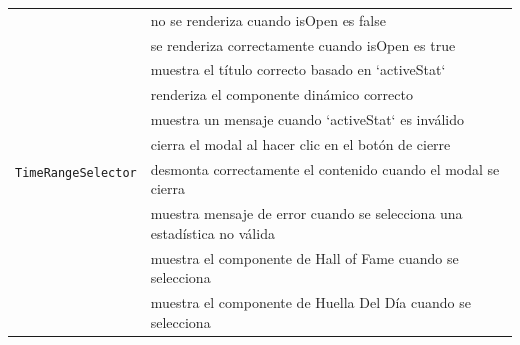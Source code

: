\begin{longtable}{|p{5cm}|p{9cm}|}
    \multirow{10}{*}{\texttt{TimeRangeSelector}}    & no se renderiza cuando isOpen es false                                       \\ \cline{2-2}
                                                    & se renderiza correctamente cuando isOpen es true                             \\ \cline{2-2}
                                                    & muestra el título correcto basado en `activeStat`                            \\ \cline{2-2}
                                                    & renderiza el componente dinámico correcto                                    \\ \cline{2-2}
                                                    & muestra un mensaje cuando `activeStat` es inválido                           \\ \cline{2-2}
                                                    & cierra el modal al hacer clic en el botón de cierre                          \\ \cline{2-2}
                                                    & desmonta correctamente el contenido cuando el modal se cierra                \\ \cline{2-2}
                                                    & muestra mensaje de error cuando se selecciona una estadística no válida      \\ \cline{2-2}
                                                    & muestra el componente de Hall of Fame cuando se selecciona                   \\ \cline{2-2}
                                                    & muestra el componente de Huella Del Día cuando se selecciona                 \\ \hline


\end{longtable}
